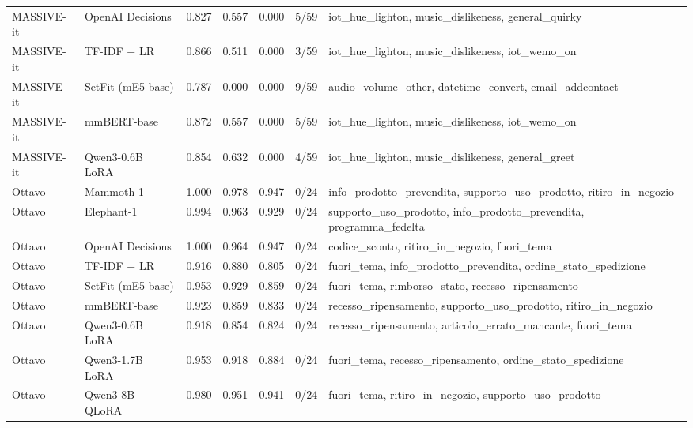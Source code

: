 \begin{tabular}{llrrrr>{\raggedright\arraybackslash}p{4.9cm}}
MASSIVE-it & OpenAI Decisions & 0.827 & 0.557 & 0.000 & 5/59 & iot\_\allowbreak{}hue\_\allowbreak{}lighton, music\_\allowbreak{}dislikeness, general\_\allowbreak{}quirky \\
MASSIVE-it & TF-IDF + LR & 0.866 & 0.511 & 0.000 & 3/59 & iot\_\allowbreak{}hue\_\allowbreak{}lighton, music\_\allowbreak{}dislikeness, iot\_\allowbreak{}wemo\_\allowbreak{}on \\
MASSIVE-it & SetFit (mE5-base) & 0.787 & 0.000 & 0.000 & 9/59 & audio\_\allowbreak{}volume\_\allowbreak{}other, datetime\_\allowbreak{}convert, email\_\allowbreak{}addcontact \\
MASSIVE-it & mmBERT-base & 0.872 & 0.557 & 0.000 & 5/59 & iot\_\allowbreak{}hue\_\allowbreak{}lighton, music\_\allowbreak{}dislikeness, iot\_\allowbreak{}wemo\_\allowbreak{}on \\
MASSIVE-it & Qwen3-0.6B LoRA & 0.854 & 0.632 & 0.000 & 4/59 & iot\_\allowbreak{}hue\_\allowbreak{}lighton, music\_\allowbreak{}dislikeness, general\_\allowbreak{}greet \\
\midrule
Ottavo & Mammoth-1 & 1.000 & 0.978 & 0.947 & 0/24 & info\_\allowbreak{}prodotto\_\allowbreak{}prevendita, supporto\_\allowbreak{}uso\_\allowbreak{}prodotto, ritiro\_\allowbreak{}in\_\allowbreak{}negozio \\
Ottavo & Elephant-1 & 0.994 & 0.963 & 0.929 & 0/24 & supporto\_\allowbreak{}uso\_\allowbreak{}prodotto, info\_\allowbreak{}prodotto\_\allowbreak{}prevendita, programma\_\allowbreak{}fedelta \\
Ottavo & OpenAI Decisions & 1.000 & 0.964 & 0.947 & 0/24 & codice\_\allowbreak{}sconto, ritiro\_\allowbreak{}in\_\allowbreak{}negozio, fuori\_\allowbreak{}tema \\
Ottavo & TF-IDF + LR & 0.916 & 0.880 & 0.805 & 0/24 & fuori\_\allowbreak{}tema, info\_\allowbreak{}prodotto\_\allowbreak{}prevendita, ordine\_\allowbreak{}stato\_\allowbreak{}spedizione \\
Ottavo & SetFit (mE5-base) & 0.953 & 0.929 & 0.859 & 0/24 & fuori\_\allowbreak{}tema, rimborso\_\allowbreak{}stato, recesso\_\allowbreak{}ripensamento \\
Ottavo & mmBERT-base & 0.923 & 0.859 & 0.833 & 0/24 & recesso\_\allowbreak{}ripensamento, supporto\_\allowbreak{}uso\_\allowbreak{}prodotto, ritiro\_\allowbreak{}in\_\allowbreak{}negozio \\
Ottavo & Qwen3-0.6B LoRA & 0.918 & 0.854 & 0.824 & 0/24 & recesso\_\allowbreak{}ripensamento, articolo\_\allowbreak{}errato\_\allowbreak{}mancante, fuori\_\allowbreak{}tema \\
Ottavo & Qwen3-1.7B LoRA & 0.953 & 0.918 & 0.884 & 0/24 & fuori\_\allowbreak{}tema, recesso\_\allowbreak{}ripensamento, ordine\_\allowbreak{}stato\_\allowbreak{}spedizione \\
Ottavo & Qwen3-8B QLoRA & 0.980 & 0.951 & 0.941 & 0/24 & fuori\_\allowbreak{}tema, ritiro\_\allowbreak{}in\_\allowbreak{}negozio, supporto\_\allowbreak{}uso\_\allowbreak{}prodotto \\
\bottomrule
\end{tabular}